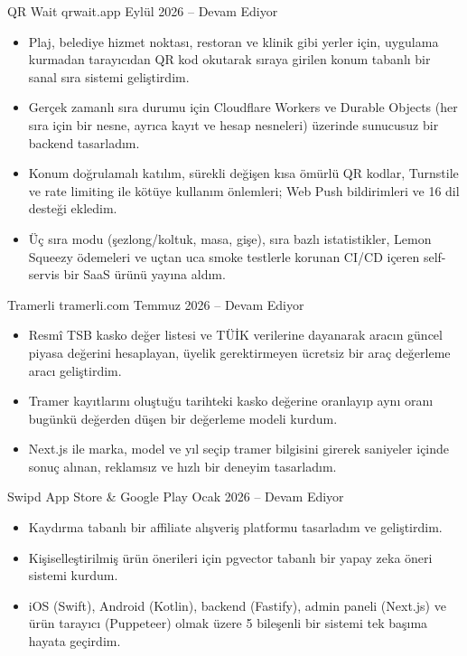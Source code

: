 \resumeProject
  {QR Wait}
  {qrwait.app}
  {}
  {Eylül 2026 -- Devam Ediyor}
\begin{itemize}
  \item Plaj, belediye hizmet noktası, restoran ve klinik gibi yerler için, uygulama kurmadan tarayıcıdan QR kod okutarak sıraya girilen konum tabanlı bir sanal sıra sistemi geliştirdim.
  \item Gerçek zamanlı sıra durumu için Cloudflare Workers ve Durable Objects (her sıra için bir nesne, ayrıca kayıt ve hesap nesneleri) üzerinde sunucusuz bir backend tasarladım.
  \item Konum doğrulamalı katılım, sürekli değişen kısa ömürlü QR kodlar, Turnstile ve rate limiting ile kötüye kullanım önlemleri; Web Push bildirimleri ve 16 dil desteği ekledim.
  \item Üç sıra modu (şezlong/koltuk, masa, gişe), sıra bazlı istatistikler, Lemon Squeezy ödemeleri ve uçtan uca smoke testlerle korunan CI/CD içeren self-servis bir SaaS ürünü yayına aldım.
\end{itemize}
\vspace{0.25em}

\resumeProject
  {Tramerli}
  {tramerli.com}
  {}
  {Temmuz 2026 -- Devam Ediyor}
\begin{itemize}
  \item Resmî TSB kasko değer listesi ve TÜİK verilerine dayanarak aracın güncel piyasa değerini hesaplayan, üyelik gerektirmeyen ücretsiz bir araç değerleme aracı geliştirdim.
  \item Tramer kayıtlarını oluştuğu tarihteki kasko değerine oranlayıp aynı oranı bugünkü değerden düşen bir değerleme modeli kurdum.
  \item Next.js ile marka, model ve yıl seçip tramer bilgisini girerek saniyeler içinde sonuç alınan, reklamsız ve hızlı bir deneyim tasarladım.
\end{itemize}
\vspace{0.25em}

\resumeProject
  {Swipd}
  {App Store \& Google Play}
  {}
  {Ocak 2026 -- Devam Ediyor}
\begin{itemize}
  \item Kaydırma tabanlı bir affiliate alışveriş platformu tasarladım ve geliştirdim.
  \item Kişiselleştirilmiş ürün önerileri için pgvector tabanlı bir yapay zeka öneri sistemi kurdum.
  \item iOS (Swift), Android (Kotlin), backend (Fastify), admin paneli (Next.js) ve ürün tarayıcı (Puppeteer) olmak üzere 5 bileşenli bir sistemi tek başıma hayata geçirdim.
\end{itemize}
\vspace{0.25em}


